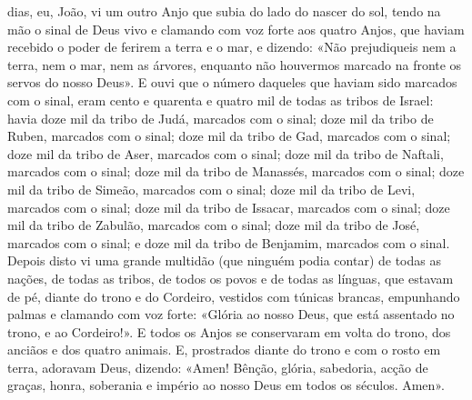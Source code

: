 \begin{paracol}{2}
{ dias, eu, João, vi um outro Anjo que subia do lado do nascer do sol, tendo na mão o sinal de Deus vivo e clamando com voz forte aos quatro Anjos, que haviam recebido o poder de ferirem a terra e o mar, e dizendo: «Não prejudiqueis nem a terra, nem o mar, nem as árvores, enquanto não houvermos marcado na fronte os servos do nosso Deus». E ouvi que o número daqueles que haviam sido marcados com o sinal, eram cento e quarenta e quatro mil de todas as tribos de Israel: havia doze mil da tribo de Judá, marcados com o sinal; doze mil da tribo de Ruben, marcados com o sinal; doze mil da tribo de Gad, marcados com o sinal; doze mil da tribo de Aser, marcados com o sinal; doze mil da tribo de Naftali, marcados com o sinal; doze mil da tribo de Manassés, marcados com o sinal; doze mil da tribo de Simeão, marcados com o sinal; doze mil da tribo de Levi, marcados com o sinal; doze mil da tribo de Issacar, marcados com o sinal; doze mil da tribo de Zabulão, marcados com o sinal; doze mil da tribo de José, marcados com o sinal; e doze mil da tribo de Benjamim, marcados com o sinal. Depois disto vi uma grande multidão (que ninguém podia contar) de todas as nações, de todas as tribos, de todos os povos e de todas as línguas, que estavam de pé, diante do trono e do Cordeiro, vestidos com túnicas brancas, empunhando palmas e clamando com voz forte: «Glória ao nosso Deus, que está assentado no trono, e ao Cordeiro!». E todos os Anjos se conservaram em volta do trono, dos anciãos e dos quatro animais. E, prostrados diante do trono e com o rosto em terra, adoravam Deus, dizendo: «Amen! Bênção, glória, sabedoria, acção de graças, honra, soberania e império ao nosso Deus em todos os séculos. Amen».
}\end{paracol}

\begin{paracol}{2}\switchcolumn{}\switchcolumn*{}\switchcolumn{}\end{paracol}

